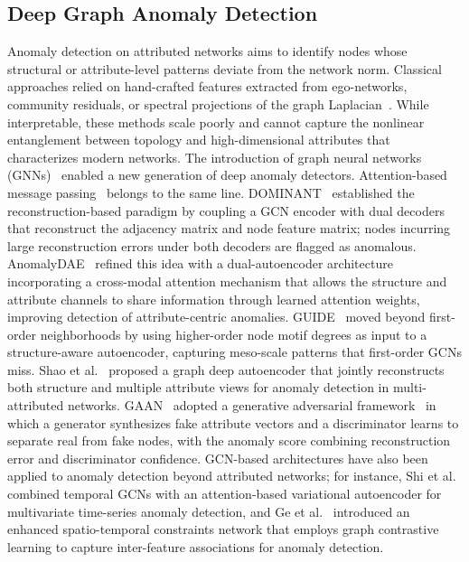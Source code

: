 \documentclass[a4paper]{cas-dc}
\theoremstyle{definition}
\begin{document}
\subsection{Deep Graph Anomaly Detection}
\label{sec:rw_gad}

Anomaly detection on attributed networks aims to identify nodes whose structural or attribute-level patterns deviate from the network norm.  Classical approaches relied on hand-crafted features extracted from ego-networks, community residuals, or spectral projections of the graph Laplacian~\cite{akoglu2015graph,sen2008collective}.  While interpretable, these methods scale poorly and cannot capture the nonlinear entanglement between topology and high-dimensional attributes that characterizes modern networks.
The introduction of graph neural networks (GNNs)~\cite{kipf2017gcn,hamilton2017inductive} enabled a new generation of deep anomaly detectors.
Attention-based message passing~\cite{velickovic2018graph} belongs to the same line.  DOMINANT~\cite{ding2019dominant} established the reconstruction-based paradigm by coupling a GCN encoder with dual decoders that reconstruct the adjacency matrix and node feature matrix; nodes incurring large reconstruction errors under both decoders are flagged as anomalous.  AnomalyDAE~\cite{fan2020anomalydae} refined this idea with a dual-autoencoder architecture incorporating a cross-modal attention mechanism that allows the structure and attribute channels to share information through learned attention weights, improving detection of attribute-centric anomalies.  GUIDE~\cite{yuan2021guide} moved beyond first-order neighborhoods by using higher-order node motif degrees as input to a structure-aware autoencoder, capturing meso-scale patterns that first-order GCNs miss.  Shao et al.~\cite{shao2023kbsgdae} proposed a graph deep autoencoder that jointly reconstructs both structure and multiple attribute views for anomaly detection in multi-attributed networks.  GAAN~\cite{chen2020gaan} adopted a generative adversarial framework~\cite{goodfellow2014generative} in which a generator synthesizes fake attribute vectors and a discriminator learns to separate real from fake nodes, with the anomaly score combining reconstruction error and discriminator confidence.
GCN-based architectures have also been applied to anomaly detection beyond attributed networks; for instance, Shi et al.~\cite{shi2023kbsmutant} combined temporal GCNs with an attention-based variational autoencoder for multivariate time-series anomaly detection, and Ge et al.~\cite{ge2024kbsestcn} introduced an enhanced spatio-temporal constraints network that employs graph contrastive learning to capture inter-feature associations for anomaly detection.
\end{document}
